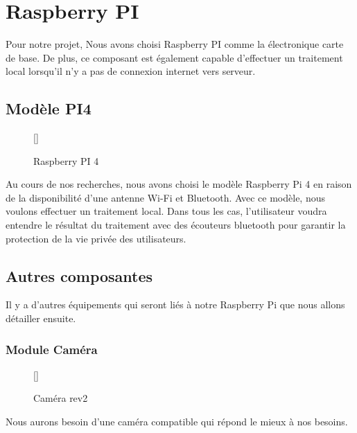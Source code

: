 {%

\pagebreak
{}

\chapter{Raspberry PI}\thispagestyle{fancy} %
Pour notre projet, Nous avons choisi Raspberry PI comme la électronique carte de base. De plus, ce composant est également capable d'effectuer un traitement local lorsqu'il n'y a pas de connexion internet vers serveur.
\section{Modèle PI4}

\begin{figure}
\centering
\raisebox{0pt}[\dimexpr{}\baselineskip\relax]{}
\caption{Raspberry PI 4}
\label{fig:figure3}
\end{figure} 
Au cours de nos recherches, nous avons choisi
le modèle Raspberry Pi 4 en raison de la disponibilité d'une antenne Wi-Fi et Bluetooth. Avec ce modèle, nous voulons effectuer un traitement local. Dans tous les cas, l'utilisateur voudra entendre le résultat du traitement avec des écouteurs bluetooth pour garantir la protection de la vie privée des utilisateurs.\\[1cm]


\section{Autres composantes}
Il y a d'autres équipements qui seront liés à notre Raspberry Pi que nous allons détailler ensuite.
    \subsection{Module Caméra}
    \begin{figure}
    \centering
    \raisebox{0pt}[\dimexpr{}\baselineskip\relax]{}
    \caption{Caméra rev2}
    \label{fig:figure3}
    \end{figure} 
    Nous aurons besoin d'une caméra compatible qui répond le mieux à nos besoins.

}
